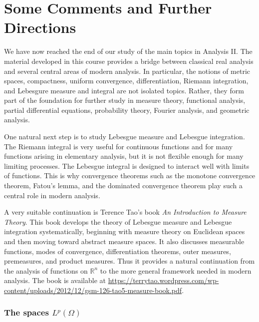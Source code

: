 \chapter{Some Comments and Further Directions}

We have now reached the end of our study of the main topics in Analysis II. The material developed in this course provides a bridge between classical real analysis and several central areas of modern analysis. In particular, the notions of metric spaces, compactness, uniform convergence, differentiation, Riemann integration, and Lebesgure measure and integral are not isolated topics. Rather, they form part of the foundation for further study in measure theory, functional analysis, partial differential equations, probability theory, Fourier analysis, and geometric analysis.

One natural next step is to study Lebesgue measure and Lebesgue integration. The Riemann integral is very useful for continuous functions and for many functions arising in elementary analysis, but it is not flexible enough for many limiting processes. The Lebesgue integral is designed to interact well with limits of functions. This is why convergence theorems such as the monotone convergence theorem, Fatou's lemma, and the dominated convergence theorem play such a central role in modern analysis.

A very suitable continuation is Terence Tao's book \textit{An Introduction to Measure Theory}. This book develops the theory of Lebesgue measure and Lebesgue integration systematically, beginning with measure theory on Euclidean spaces and then moving toward abstract measure spaces. It also discusses measurable functions, modes of convergence, differentiation theorems, outer measures, premeasures, and product measures. Thus it provides a natural continuation from the analysis of functions on $\mathbb{R}^{n}$ to the more general framework needed in modern analysis. The book is available at \url{https://terrytao.wordpress.com/wp-content/uploads/2012/12/gsm-126-tao5-measure-book.pdf}.

\subsection*{The spaces $L^{p}(\Omega)$}

